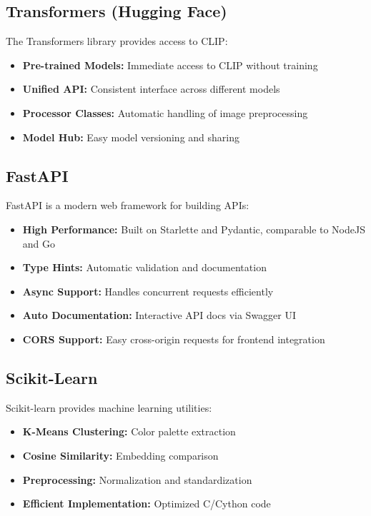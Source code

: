 \documentclass[12pt,a4paper]{report}
\begin{document}
\subsection{Transformers (Hugging Face)}

The Transformers library provides access to CLIP:

\begin{itemize}
    \item \textbf{Pre-trained Models:} Immediate access to CLIP without training
    \item \textbf{Unified API:} Consistent interface across different models
    \item \textbf{Processor Classes:} Automatic handling of image preprocessing
    \item \textbf{Model Hub:} Easy model versioning and sharing
\end{itemize}

\subsection{FastAPI}

FastAPI is a modern web framework for building APIs:

\begin{itemize}
    \item \textbf{High Performance:} Built on Starlette and Pydantic, comparable to NodeJS and Go
    \item \textbf{Type Hints:} Automatic validation and documentation
    \item \textbf{Async Support:} Handles concurrent requests efficiently
    \item \textbf{Auto Documentation:} Interactive API docs via Swagger UI
    \item \textbf{CORS Support:} Easy cross-origin requests for frontend integration
\end{itemize}

\subsection{Scikit-Learn}

Scikit-learn provides machine learning utilities:

\begin{itemize}
    \item \textbf{K-Means Clustering:} Color palette extraction
    \item \textbf{Cosine Similarity:} Embedding comparison
    \item \textbf{Preprocessing:} Normalization and standardization
    \item \textbf{Efficient Implementation:} Optimized C/Cython code
\end{itemize}
\end{document}
